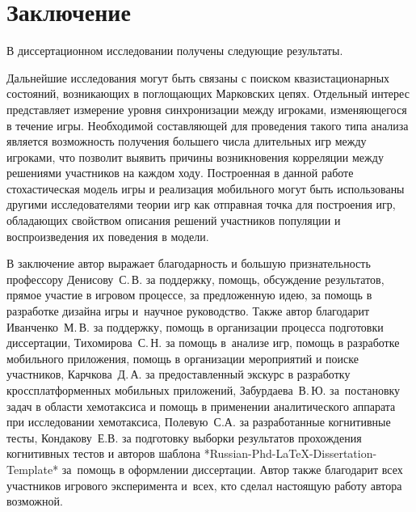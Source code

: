 \chapter*{Заключение}                       %


В диссертационном исследовании получены следующие результаты.


Дальнейшие исследования могут быть связаны с поиском квазистационарных состояний, возникающих в поглощающих Марковских цепях. Отдельный интерес представляет измерение уровня синхронизации между игроками, изменяющегося в течение игры. Необходимой составляющей для проведения такого типа анализа является возможность получения большего числа длительных игр между игроками, что позволит выявить причины возникновения корреляции между решениями участников на каждом ходу. Построенная в данной работе стохастическая модель игры и реализация мобильного могут быть использованы другими исследователями теории игр как отправная точка для построения игр, обладающих свойством описания решений участников популяции и воспроизведения их поведения в модели. 

В заключение автор выражает благодарность и большую признательность профессору Денисову~С.\,В. за поддержку, помощь, обсуждение результатов, прямое участие в игровом процессе, за предложенную идею, за помощь в разработке дизайна игры и~научное руководство. Также автор благодарит Иванченко~М.\,В. за поддержку, помощь в организации процесса подготовки диссертации, Тихомирова~С.\,Н. за помощь в~анализе игр, помощь в разработке мобильного приложения, помощь в организации мероприятий и поиске участников, Карчкова~Д.\,А. за предоставленный экскурс в разработку кроссплатформенных мобильных приложений, Забурдаева~В.\,Ю. за~постановку задач в области хемотаксиса и помощь в применении аналитического аппарата при исследовании хемотаксиса, Полевую~С.А. за разработанные когнитивные тесты, Кондакову~Е.В. за подготовку выборки результатов прохождения когнитивных тестов и авторов шаблона *Russian-Phd-LaTeX-Dissertation-Template* за~помощь в оформлении диссертации. Автор также благодарит всех участников игрового эксперимента и~всех, кто сделал настоящую работу автора возможной.
